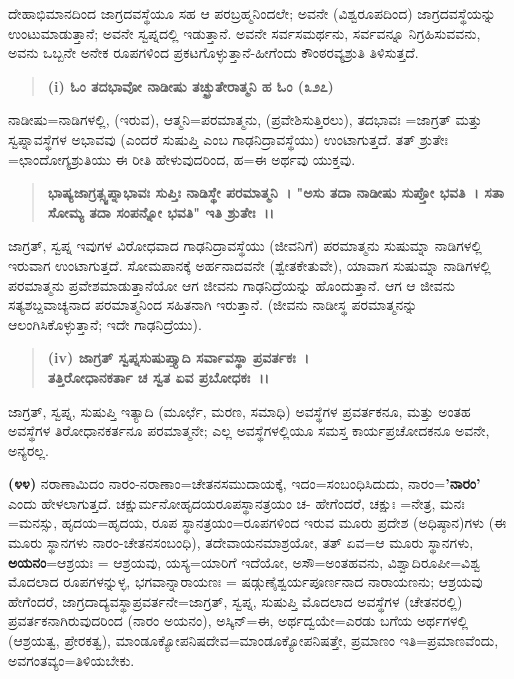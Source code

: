 ದೇಹಾಭಿಮಾನದಿಂದ ಜಾಗ್ರದವಸ್ಥೆಯೂ ಸಹ ಆ ಪರಬ್ರಹ್ಮನಿಂದಲೇ; ಅವನೇ (ವಿಶ್ವರೂಪದಿಂದ) ಜಾಗ್ರದವಸ್ಥೆಯನ್ನು ಉಂಟುಮಾಡುತ್ತಾನೆ; ಅವನೇ ಸ್ವಪ್ನದಲ್ಲಿ ಇಡುತ್ತಾನೆ. ಅವನೇ ಸರ್ವಸಮರ್ಥನು, ಸರ್ವವನ್ನೂ ನಿಗ್ರಹಿಸುವವನು, ಅವನು ಒಬ್ಬನೇ ಅನೇಕ ರೂಪಗಳಿಂದ ಪ್ರಕಟಗೊಳ್ಳುತ್ತಾನೆ-ಹೀಗೆಂದು ಕೌಂಠರವ್ಯಶ್ರುತಿ ತಿಳಿಸುತ್ತದೆ.

\begin{verse}
\textbf{(i) ಓಂ ತದಭಾವೋ ನಾಡೀಷು ತಚ್ಛ್ರುತೇರಾತ್ಮನಿ ಹ ಓಂ (೩\enginline{-}೨\enginline{-}೭)}
\end{verse}

ನಾಡೀಷು=ನಾಡಿಗಳಲ್ಲಿ, (ಇರುವ), ಆತ್ಮನಿ=ಪರಮಾತ್ಮನು, (ಪ್ರವೇಶಿಸುತ್ತಿರಲು), ತದಭಾವಃ =ಜಾಗ್ರತ್ ಮತ್ತು ಸ್ವಪ್ನಾವಸ್ಥೆಗಳ ಅಭಾವವು (ಎಂದರೆ ಸುಷುಪ್ತಿ ಎಂಬ ಗಾಢನಿದ್ರಾ\-ವಸ್ಥೆಯು) ಉಂಟಾಗುತ್ತದೆ. ತತ್ ಶ್ರುತೇಃ =ಛಾಂದೋಗ್ಯಶ್ರುತಿಯು ಈ ರೀತಿ ಹೇಳುವುದರಿಂದ, ಹ=ಈ ಅರ್ಥವು ಯುಕ್ತವು.

\begin{verse}
\textbf{ಭಾಷ್ಯ\enginline{-}ಜಾಗ್ರತ್ಸ್ವಪ್ನಾಭಾವಃ ಸುಪ್ತಿಃ ನಾಡಿಸ್ಥೇ ಪರಮಾತ್ಮನಿ~। "ಅಸು ತದಾ ನಾಡೀಷು ಸುಪ್ತೋ ಭವತಿ~। ಸತಾ ಸೋಮ್ಯ ತದಾ ಸಂಪನ್ನೋ ಭವತಿ" ಇತಿ ಶ್ರುತೇಃ~।।}
\end{verse}

ಜಾಗ್ರತ್, ಸ್ವಪ್ನ ಇವುಗಳ ವಿರೋಧವಾದ ಗಾಢನಿದ್ರಾವಸ್ಥೆಯು (ಜೀವನಿಗೆ) ಪರಮಾತ್ಮನು ಸುಷುಮ್ನಾ ನಾಡಿಗಳಲ್ಲಿ ಇರುವಾಗ ಉಂಟಾಗುತ್ತದೆ. ಸೋಮಪಾನಕ್ಕೆ ಅರ್ಹನಾದವನೇ (ಶ್ವೇತಕೇತುವೇ), ಯಾವಾಗ ಸುಷುಮ್ನಾ ನಾಡಿಗಳಲ್ಲಿ ಪರಮಾತ್ಮನು ಪ್ರವೇಶಮಾಡುತ್ತಾ\-ನೆಯೋ ಆಗ ಜೀವನು ಗಾಢನಿದ್ರೆಯನ್ನು ಹೊಂದುತ್ತಾನೆ. ಆಗ ಆ ಜೀವನು ಸತ್ಯಶಬ್ದವಾಚ್ಯನಾದ ಪರಮಾತ್ಮನಿಂದ ಸಹಿತನಾಗಿ ಇರುತ್ತಾನೆ. (ಜೀವನು ನಾಡೀಸ್ಥ ಪರಮಾತ್ಮನನ್ನು ಆಲಂಗಿಸಿ\-ಕೊಳ್ಳುತ್ತಾನೆ; ಇದೇ ಗಾಢನಿದ್ರೆಯು).

\begin{verse}
\textbf{(iv) ಜಾಗ್ರತ್ ಸ್ವಪ್ನಸುಷುಪ್ತ್ಯಾದಿ ಸರ್ವಾವಸ್ಥಾ ಪ್ರವರ್ತಕಃ~।}\\\textbf{ತತ್ತಿರೋಧಾನಕರ್ತಾ ಚ ಸ್ವತ ಏವ ಪ್ರಬೋಧಕಃ~।।}
\end{verse}


ಜಾಗ್ರತ್, ಸ್ವಪ್ನ, ಸುಷುಪ್ತಿ ಇತ್ಯಾದಿ (ಮೂರ್ಛೆ, ಮರಣ, ಸಮಾಧಿ) ಅವಸ್ಥೆಗಳ ಪ್ರವರ್ತಕನೂ, ಮತ್ತು ಅಂತಹ ಅವಸ್ಥೆಗಳ ತಿರೋಧಾನಕರ್ತನೂ ಪರಮಾತ್ಮನೇ; ಎಲ್ಲ ಅವಸ್ಥೆಗಳಲ್ಲಿಯೂ ಸಮಸ್ತ ಕಾರ್ಯಪ್ರಚೋದಕನೂ ಅವನೇ, ಅನ್ಯರಲ್ಲ.

\textbf{(೪೪)} ನರಾಣಾಮಿದಂ ನಾರಂ-ನರಾಣಾಂ=ಚೇತನಸಮುದಾಯಕ್ಕೆ, ಇದಂ=ಸಂಬಂಧಿ\-ಸಿದುದು, ನಾರಂ=\textbf{'ನಾರಂ'} ಎಂದು ಹೇಳಲಾಗುತ್ತದೆ. ಚಕ್ಷುರ್ಮನೋಹೃದಯರೂಪಸ್ಥಾನ\-ತ್ರಯಂ ಚ- ಹೇಗೆಂದರೆ, ಚಕ್ಷುಃ =ನೇತ್ರ, ಮನಃ =ಮನಸ್ಸು, ಹೃದಯ=ಹೃದಯ, ರೂಪ ಸ್ಥಾನತ್ರಯಂ=ರೂಪಗಳಿಂದ ಇರುವ ಮೂರು ಪ್ರದೇಶ (ಅಧಿಷ್ಠಾನ)ಗಳು (ಈ ಮೂರು ಸ್ಥಾನಗಳು ನಾರಂ-ಚೇತನಸಂಬಂಧಿ), ತದೇವಾಯನಮಾಶ್ರಯೋ, ತತ್ ಏವ=ಆ ಮೂರು ಸ್ಥಾನಗಳು, \textbf{ಅಯನಂ}=ಆಶ್ರಯಃ = ಆಶ್ರಯವು, ಯಸ್ಯ=ಯಾರಿಗೆ ಇದೆಯೋ, ಅಸೌ=ಅಂತಹವನು, ವಿಶ್ವಾದಿರೂಪೀ=ವಿಶ್ವ ಮೊದಲಾದ ರೂಪಗಳನ್ನುಳ್ಳ, ಭಗವಾನ್ನಾರಾ\-ಯಣಃ = ಷಡ್ಗುಣೈಶ್ವರ್ಯಪೂರ್ಣನಾದ ನಾರಾಯಣನು; ಆಶ್ರಯವು ಹೇಗೆಂದರೆ, ಜಾಗ್ರದಾ\-ದ್ಯವಸ್ಥಾಪ್ರವರ್ತನೇ=\-ಜಾಗ್ರತ್, ಸ್ವಪ್ನ, ಸುಷುಪ್ತಿ ಮೊದಲಾದ ಅವಸ್ಥೆಗಳ (ಚೇತನರಲ್ಲಿ) ಪ್ರವರ್ತಕನಾಗಿರುವುದರಿಂದ (ನಾರಂ ಅಯನಂ), ಅಸ್ಕಿನ್=ಈ, ಅರ್ಥದ್ವಯೇ=ಎರಡು ಬಗೆಯ ಅರ್ಥಗಳಲ್ಲಿ (ಆಶ್ರಯತ್ವ, ಪ್ರೇರಕತ್ವ), ಮಾಂಡೂಕ್ಯೋಪನಿಷದೇವ=ಮಾಂಡೂಕ್ಯೋ\-ಪನಿಷತ್ತೇ, ಪ್ರಮಾಣಂ ಇತಿ=ಪ್ರಮಾಣವೆಂದು, ಅವಗಂತವ್ಯಂ=ತಿಳಿಯಬೇಕು.

